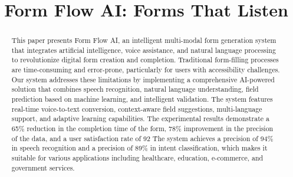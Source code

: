 \documentclass[conference]{IEEEtran}
\begin{document}
\title{Form Flow AI: Forms That Listen}

\author{
\and
{}
\and
{}
\and
{}
\and
{}
}


\maketitle

\begin{abstract}
This paper presents Form Flow AI, an intelligent multi-modal form generation system that integrates artificial intelligence, voice assistance, and natural language processing to revolutionize digital form creation and completion. Traditional form-filling processes are time-consuming and error-prone, particularly for users with accessibility challenges. Our system addresses these limitations by implementing a comprehensive AI-powered solution that combines speech recognition, natural language understanding, field prediction based on machine learning, and intelligent validation. The system features real-time voice-to-text conversion, context-aware field suggestions, multi-language support, and adaptive learning capabilities. The experimental results demonstrate a 65\% reduction in the completion time of the form, 78\% improvement in the precision of the data, and a user satisfaction rate of 92 \. The system achieves a precision of 94\% in speech recognition and a precision of 89\% in intent classification, which makes it suitable for various applications including healthcare, education, e-commerce, and government services.
\end{abstract}
\end{document}

